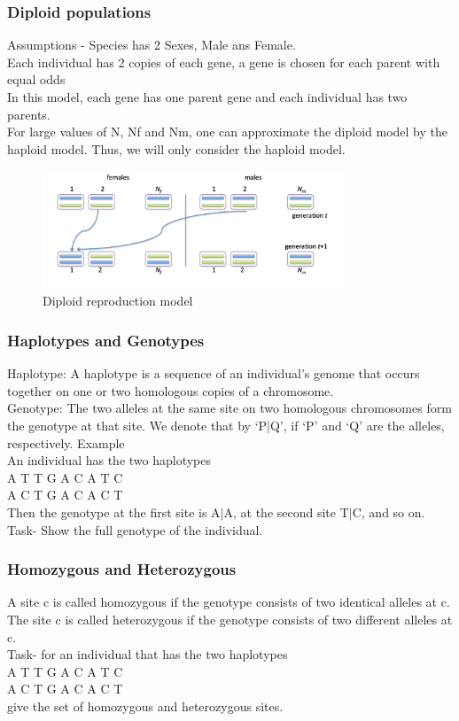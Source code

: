 \documentclass{beamer}
\begin{document}
    \begin{frame}
        \frametitle{Diploid populations}
        Assumptions - 
        Species has 2 Sexes, Male ans Female. \\
        Each individual has 2 copies of each gene, a gene is chosen for each parent with equal odds \\
        In this model, each gene has one parent gene and each individual has two parents.\\
        For large values of N, Nf and Nm, one can approximate the diploid model by the haploid model.
        Thus, we will only consider the haploid model.\\
        \begin{figure}
            \includegraphics[width=0.8\textwidth]{diploidRep.png}
               \caption{Diploid reproduction model}
           \end{figure}
    \end{frame}

    \begin{frame}
        \frametitle{Haplotypes and Genotypes}
        Haplotype: A haplotype is a sequence of an individual’s genome that occurs together on one or two homologous copies of a chromosome.\\
        Genotype: The two alleles at the same site on two homologous chromosomes form the genotype at that site. We denote that by ‘P$|$Q’, if ‘P’ and ‘Q’ are the alleles, respectively.
        Example \\
        An individual has the two haplotypes \\
        A T T G A C A T C \\
        A C T G A C A C T \\
        Then the genotype at the first site is A$|$A, at the second site T$|$C, and so on. \\
        Task- Show the full genotype of the individual.
    \end{frame}

    \begin{frame}
        \frametitle{Homozygous and Heterozygous}
        A site c is called homozygous if the genotype consists of two identical alleles at c. The site c is called heterozygous if the genotype consists of two different alleles at c. \\
        Task- for an individual that has the two haplotypes \\
        A T T G A C A T C \\
        A C T G A C A C T \\
        give the set of homozygous and heterozygous sites. 
    \end{frame}
\end{document}
